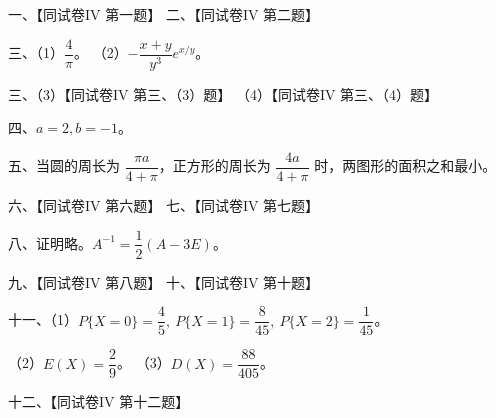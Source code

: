 \documentclass[UTF8,12pt]{ctexart}
\begin{document}
一、【同试卷IV 第一题】 二、【同试卷IV 第二题】


三、（1）\(\displaystyle \dfrac{\displaystyle 4}{\displaystyle \pi}\)。 （2）\(\displaystyle -\dfrac{\displaystyle x+y}{\displaystyle y^3}e^{x/y}\)。


三、（3）【同试卷IV 第三、（3）题】 （4）【同试卷IV 第三、（4）题】


四、\(\displaystyle a=2,\allowbreak b=-1\)。


五、当圆的周长为 \(\displaystyle \dfrac{\displaystyle \pi a}{\displaystyle 4+\pi}\)，正方形的周长为 \(\displaystyle \dfrac{\displaystyle 4a}{\displaystyle 4+\pi}\) 时，两图形的面积之和最小。


六、【同试卷IV 第六题】 七、【同试卷IV 第七题】


八、证明略。\(\displaystyle A^{-1}=\dfrac{\displaystyle 1}{\displaystyle 2}(A-3E)\)。


九、【同试卷IV 第八题】 十、【同试卷IV 第十题】


十一、（1）\(\displaystyle P\{X=0\}=\dfrac{\displaystyle 4}{\displaystyle 5},\allowbreak \ P\{X=1\}=\dfrac{\displaystyle 8}{\displaystyle 45},\allowbreak \ P\{X=2\}=\dfrac{\displaystyle 1}{\displaystyle 45}\)。


（2）\(\displaystyle E(X)=\dfrac{\displaystyle 2}{\displaystyle 9}\)。 （3）\(\displaystyle D(X)=\dfrac{\displaystyle 88}{\displaystyle 405}\)。


十二、【同试卷IV 第十二题】
\end{document}
